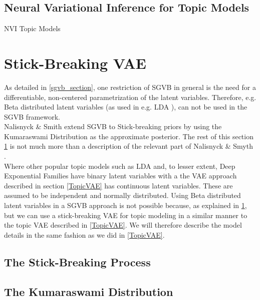 \documentclass{article}
\begin{document}
\subsection{Neural Variational Inference for Topic Models}\label{NVItopic}
NVI Topic Models
\section{Stick-Breaking VAE}\label{sbvae_section}
As detailed in \ref{sgvb_section}, one restriction of SGVB in general is the need for a differentiable, non-centered parametrization of the latent variables. Therefore, e.g. Beta distributed latent variables (as used in e.g. LDA \cite{bleil2003latent}), can not be used in the SGVB framework. \\ Nalisnyck \& Smith extend SGVB to Stick-breaking priors by using the Kumaraswami Distribution as the approximate posterior. The rest of this section \ref{sbvae_section} is not much more than a description of the relevant part of Nalisnyck \& Smyth \cite{nalisnick2016deep}.\\ 
Where other popular topic models such as LDA \cite{blei2003latent} and, to lesser extent, Deep Exponential Families \cite{ranganath2015deep} have binary latent variables with a the VAE approach described in section \ref{TopicVAE} has continuous latent variables. These are assumed to be independent and normally distributed. Using Beta distributed latent variables in a SGVB approach is not possible because, as explained in \ref{sbvae_section}, but we can use a stick-breaking VAE for topic modeling in a similar manner to the topic VAE described in \ref{TopicVAE}. We will therefore describe the model details in the same fashion as we did in \ref{TopicVAE}. \\

\subsection{The Stick-Breaking Process}\label{sb_process}

\subsection{The Kumaraswami Distribution}\label{kum}

	
	
\end{document}
